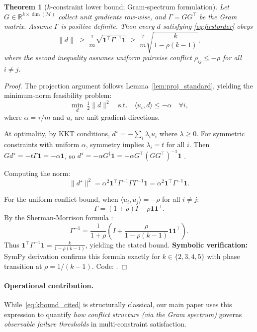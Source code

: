\documentclass{article}
\theoremstyle{plain}
\newtheorem{theorem}{Theorem}[section]
\theoremstyle{definition}
\theoremstyle{remark}
\begin{document}
\begin{theorem}[$k$-constraint lower bound; Gram-spectrum formulation]
\label{thm:k_bound_cited}
Let $G \in \mathbb{R}^{k \times \dim(\mathcal{M})}$ collect unit gradients row-wise,
and $\Gamma = GG^\top$ be the Gram matrix. Assume $\Gamma$ is positive definite.
Then every $d$ satisfying \eqref{eq:firstorder} obeys
\begin{equation}
\|d\|
\;\ge\;
\frac{\tau}{m} \sqrt{\mathbf{1}^\top \Gamma^{-1} \mathbf{1}}
\;\ge\;
\frac{\tau}{m}\sqrt{\frac{k}{1-\rho(k-1)}},
\label{eq:kbound_cited}
\end{equation}
where the second inequality assumes uniform pairwise conflict $\rho_{ij} \le -\rho$ for all $i \neq j$.
\end{theorem}

\begin{proof}
The projection argument follows Lemma~\ref{lem:proj_standard}, yielding the minimum-norm feasibility problem:
\[
\min_{d}\ \tfrac{1}{2}\|d\|^2 \quad \text{s.t.}\quad \langle u_i, d \rangle \le -\alpha \quad \forall i,
\]
where $\alpha = \tau/m$ and $u_i$ are unit gradient directions.

At optimality, by KKT conditions, $d^\star = -\sum_i \lambda_i u_i$ where $\lambda \ge 0$.
For symmetric constraints with uniform $\alpha$, symmetry implies $\lambda_i = t$ for all $i$.
Then $Gd^\star = -t\Gamma\mathbf{1} = -\alpha\mathbf{1}$,
so $d^\star = -\alpha G^\dagger \mathbf{1} = -\alpha G^\top(GG^\top)^{-1}\mathbf{1}$
\citep[Chap.~6]{hornjohnson2013matrix}.

Computing the norm:
\[
\|d^\star\|^2 = \alpha^2 \mathbf{1}^\top \Gamma^{-1} \Gamma \Gamma^{-1} \mathbf{1} = \alpha^2 \mathbf{1}^\top \Gamma^{-1}\mathbf{1}.
\]

For the uniform conflict bound, when $\langle u_i, u_j \rangle = -\rho$ for all $i \neq j$:
\[
\Gamma = (1+\rho)I - \rho \mathbf{1}\mathbf{1}^\top.
\]
By the Sherman-Morrison formula \citep{hornjohnson2013matrix}:
\[
\Gamma^{-1} = \frac{1}{1+\rho}\left(I + \frac{\rho}{1-\rho(k-1)}\mathbf{1}\mathbf{1}^\top\right).
\]
Thus $\mathbf{1}^\top \Gamma^{-1}\mathbf{1} = \frac{k}{1-\rho(k-1)}$, yielding the stated bound.
\textbf{Symbolic verification:} SymPy derivation confirms this formula exactly for $k \in \{2,3,4,5\}$ with phase transition at $\rho = 1/(k{-}1)$. Code: .
\end{proof}

\paragraph{Operational contribution.}
While~\eqref{eq:kbound_cited} is structurally classical,
our main paper uses this expression to quantify
\textit{how conflict structure (via the Gram spectrum)}
governs \textit{observable failure thresholds}
in multi-constraint satisfaction.
\end{document}
